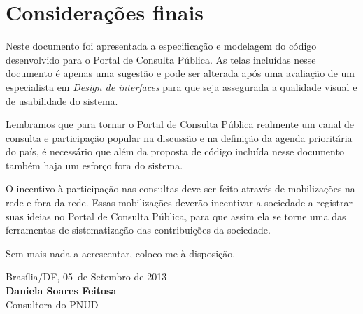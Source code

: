 \documentclass[11pt]{article}
\newcommand{\MyName}{Daniela Soares Feitosa}
\newcommand{\MesEntrega}{Setembro de 2013}
\newcommand{\DiaEntrega}{05}
\begin{document}
\newpage

\section{Considerações finais}

Neste documento foi apresentada a especificação e modelagem do código
desenvolvido para o Portal de Consulta Pública. As telas incluídas nesse
documento é apenas uma sugestão e pode ser alterada após uma avaliação
de um especialista em {\it Design de interfaces} para que seja
assegurada a qualidade visual e de usabilidade do sistema.

Lembramos que para tornar o Portal de Consulta Pública realmente um canal de
consulta e participação popular na discussão e na definição da agenda
prioritária do país, é necessário que além da proposta de código
incluída nesse documento também haja um esforço fora do sistema.

O incentivo à participação nas consultas deve ser feito através de
mobilizações na rede e fora da rede. Essas mobilizações deverão
incentivar a sociedade a registrar suas ideias no Portal de Consulta
Pública, para que assim ela se torne uma das ferramentas de
sistematização das contribuições da sociedade.

\vspace{1cm}

Sem mais nada a acrescentar, coloco-me à disposição.

\vspace{1cm}

\begin{minipage}{\textwidth}
  Brasília/DF, \DiaEntrega \ de \MesEntrega\\[1cm]
  \textbf{\MyName}\\
  \small Consultora do PNUD
\end{minipage}

\newpage
\appendix
\appendixpage

\end{document}
